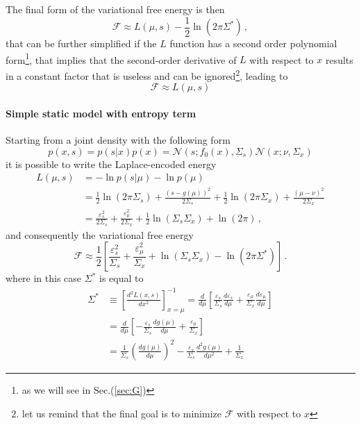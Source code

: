 \documentclass[10pt]{article}
\begin{document}
The final form of the variational free energy is then
\begin{equation}
\mathcal{F} \approx L(\mu,s) - \frac{1}{2} \ln \left( 2 \pi \Sigma^{\ast} \right) \, ,
\end{equation}
that can be further simplified if the $L$ function has a second order polynomial form\footnote{as we will see in Sec.(\ref{sec:G})}, that implies that the second-order derivative of $L$ with respect to $x$ results in a constant factor that is useless and can be ignored\footnote{ let us remind that the final goal is to minimize $\mathcal{F}$ with respect to $x$}, leading to 
\begin{equation}
\mathcal{F} \approx L(\mu,s)
\label{eqn:encoded_F}
\end{equation}

\paragraph{Simple static model with entropy term}
Starting from a joint density with the following form
\begin{equation}
p(x,s) = p(s | x) p(x) = \mathcal{N}(s;f_0(x),\Sigma_s) \mathcal{N}(x;\nu,\Sigma_{x}) 
\label{eq:gm}
\end{equation}
it is possible to write the Laplace-encoded energy
\begin{equation}
\begin{split}
L(\mu,s) & = - \ln p(s|\mu) - \ln p(\mu)  \\
		 & = \frac{1}{2} \ln (2 \pi \Sigma_{s}) + \frac{(s-g(\mu))^2}{2 \Sigma_{s}} + \frac{1}{2} \ln (2 \pi \Sigma_{x}) + \frac{(\mu-\nu)^2}{2 \Sigma_{x}} \\
		 & = \frac{\varepsilon_{s}^2}{2 \Sigma_{s}} + \frac{\varepsilon_{\mu}^2}{2 \Sigma_{x}} + \frac{1}{2} \ln \left( \Sigma_{s} \Sigma_{x} \right) + \ln (2 \pi) \, ,
\end{split}
\end{equation}
and consequently the variational free energy
\begin{equation}
\mathcal{F} \approx \frac{1}{2} \left[\frac{\varepsilon_{s}^2}{\Sigma_{s}} + \frac{\varepsilon_{\mu}^2}{ \Sigma_{x}} + \ln \left( \Sigma_{s} \Sigma_{x} \right) -\ln (2 \pi \Sigma^*) \right] \, .
\end{equation}
where in this case $\Sigma^*$ is equal to
\begin{equation}
\begin{split}
		\Sigma^* & \equiv \left[ \frac{d^2 L(x,s)}{dx^2} \right]^{-1}_{x=\mu} = \frac{d}{d \mu} \left[\frac{\varepsilon_{s}}{\Sigma_{s}} \frac{d \varepsilon_{s}}{d \mu} + \frac{\varepsilon_{\mu}}{\Sigma_{x}} \frac{d \varepsilon_{\mu}}{d \mu} \right] \\
				& = \frac{d}{d \mu} \left[ - \frac{\varepsilon_{s}}{\Sigma{_s}} \frac{d g(\mu)}{d \mu} + \frac{\varepsilon_{\mu}}{\Sigma_{x}} \right] \\
				& = \frac{1}{\Sigma_s} \left( \frac{d g(\mu)}{d \mu} \right)^2 - \frac{\varepsilon_s}{\Sigma_s} \frac{d^2 g(\mu)}{d \mu^2} + \frac{1}{\Sigma_x}
	\end	{split}
\end{equation}
\end{document}

